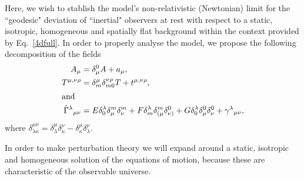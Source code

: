 \documentclass[twocolumn,aps,showpacs,showkeys,prl,superscriptaddress]{revtex4-1}
\begin{document}
Here, we wish to stablish the model's non-relativistic (Newtonian) limit for the ``geodesic" deviation of ``inertial" observers at rest with respect to a static, isotropic, homogeneous and spatially flat background within the context provided by Eq.~\eqref{4dfull}. In order to properly analyse the model, we  propose the following decomposition of the fields
\begin{align}
  A_\mu &= \delta_\mu^0 A + a_\mu,\\
  T^{\mu,\nu\rho} &= \delta^{\mu}_m\delta^{\nu\rho}_{m0}T + t^{\mu,\nu\rho},\\
  \shortintertext{and}
  \hat{\Gamma}^\lambda{}_{\mu\nu} &= E \delta^\lambda_0 \delta^m_\mu \delta^m_\nu + F \delta^\lambda_m \delta^m_{(\mu}\delta^0_{\nu)} + G\delta^\lambda_0 \delta^0_{\mu}\delta^0_{\nu} + \gamma^\lambda{}_{\mu\nu},
\end{align}
where $\delta^{\mu\nu}_{\lambda\kappa}=\delta^{\mu}_{\lambda}\delta^{\nu}_{\kappa}-\delta^{\mu}_{\kappa}\delta^{\nu}_{\lambda}$.


In order to make perturbation theory we will expand around a static, isotropic and homogeneous solution of the equations of motion, because these are characteristic of the observable universe.
\end{document}
